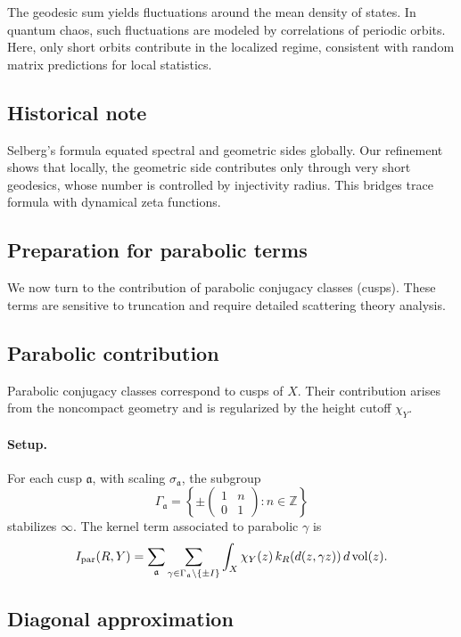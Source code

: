 The geodesic sum yields fluctuations around the mean density of states. In quantum chaos, such fluctuations are modeled by correlations of periodic orbits. Here, only short orbits contribute in the localized regime, consistent with random matrix predictions for local statistics.

\subsection{Historical note}\label{subsec:geom-history}

Selberg’s formula equated spectral and geometric sides globally. Our refinement shows that locally, the geometric side contributes only through very short geodesics, whose number is controlled by injectivity radius. This bridges trace formula with dynamical zeta functions.

\subsection{Preparation for parabolic terms}\label{subsec:geom-next}

We now turn to the contribution of parabolic conjugacy classes (cusps). These terms are sensitive to truncation and require detailed scattering theory analysis.

\subsection{Parabolic contribution}\label{subsec:geom-parabolic}

Parabolic conjugacy classes correspond to cusps of $X$. Their contribution arises from the noncompact geometry and is regularized by the height cutoff $\chi_Y$.

\paragraph{Setup.} For each cusp $\mathfrak{a}$, with scaling $\sigma_\mathfrak{a}$, the subgroup
\[
\Gamma_\mathfrak{a}=\left\{\pm\begin{pmatrix}1&n\\0&1\end{pmatrix}:n\in\mathbb{Z}\right\}
\]
stabilizes $\infty$. The kernel term associated to parabolic $\gamma$ is
\[
I_{\mathrm{par}}(R,Y)=\sum_{\mathfrak{a}}\sum_{\gamma\in\Gamma_\mathfrak{a}\setminus\{\pm I\}}
\int_X \chi_Y(z)\,k_R(d(z,\gamma z))\,d\operatorname{vol}(z).
\]

\subsection{Diagonal approximation}\label{subsec:geom-par-diagonal}

